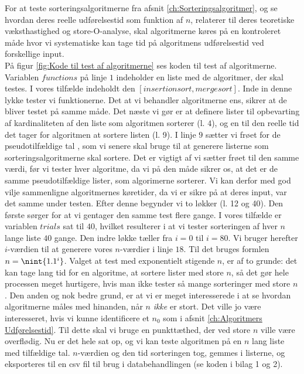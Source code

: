 For at teste sorteringsalgoritmerne fra afsnit \ref{ch:Sorteringsalgoritmer}, og se hvordan deres reelle udførelsestid som funktion af $n$, relaterer til deres teoretiske væksthastighed og store-O-analyse, skal algoritmerne køres på en kontroleret måde hvor vi systematiske kan tage tid på algoritmens udførelsestid ved forskellige input.\\

På figur \ref{fig:Kode til test af algoritmerne} ses koden til test af algoritmerne. Variablen $functions$ på linje $1$ indeholder en liste med de algoritmer, der skal testes. I vores tilfælde indeholdt den $[insertionsort,mergesort]$. Inde in denne lykke tester vi funktionerne. Det at vi behandler algoritmerne ens, sikrer at de bliver testet på samme måde. Det næste vi gør er at definere lister til opbevarting af kardinaliteten af den liste som algoritmen sorterer (l. $4$), og en til den reelle tid det tager for algoritmen at sortere listen (l. 9).  I linje $9$ sætter vi frøet for de pseudotilfældige tal \cite{python-random}, som vi senere skal bruge til at generere listerne som sorteringsalgoritmerne skal sortere. Det er vigtigt af vi sætter frøet til den samme værdi, før vi tester hver algoritme, da vi på den måde sikrer os, at det er de samme pseudotilfældige lister, som algorimerne sorterer. Vi kan derfor med god vilje sammenligne algoritmernes køretider, da vi er sikre på at deres input, var det samme under testen. Efter denne  begynder vi to løkker (l. 12 og 40). Den første sørger for at vi gentager den samme test flere gange. I vores tilfælde er variablen $trials$ sat til $40$, hvilket resulterer i at vi tester sorteringen af hver $n$ lange liste $40$ gange. Den indre løkke tæller fra $i=0$ til $i=80$. Vi bruger herefter $i$-værdien til at generere vores $n$-værdier i linje $18$. Til det bruges formlen $n=\nint{1.1^i}$. Valget at test med exponentielt stigende $n$, er af to grunde: det kan tage lang tid for en algoritme, at sortere lister med store $n$, så det gør hele processen meget hurtigere, hvis man ikke tester så mange sorteringer med store $n$. Den anden og nok bedre grund, er at vi er meget interesserede i at se hvordan algoritmerne måles med hinanden, når $n$ \emph{ikke} er stort. Det ville jo være interesseret, hvis vi kunne identificere et $n_0$ som i afsnit \ref{ch:Algoritmers Udførelsestid}. Til dette skal vi bruge en punkttæthed, der ved store $n$ ville være overflødig. Nu er det hele sat op, og vi kan teste algoritmen på en $n$ lang liste med tilfældige tal. $n$-værdien og den tid sorteringen tog, gemmes i listerne, og eksporteres til en csv fil til brug i databehandlingen (se koden i bilag 1 og 2).


